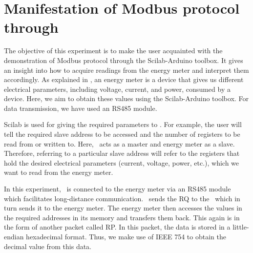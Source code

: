 
\section{Manifestation of Modbus protocol through \scilab}
The objective of this experiment is to make the user acquainted with
the demonstration of Modbus protocol through the Scilab-Arduino toolbox. 
It gives an insight into how to acquire readings from the energy meter and interpret them accordingly. As explained in , 
an energy meter is a device that gives us different electrical parameters, including voltage, current, and power, consumed by a device. Here, we aim to obtain these values using the Scilab-Arduino toolbox. For data transmission, we have used an RS485 module.

Scilab is used for giving the required parameters to \arduino. For
example, the user will tell the required slave address to be accessed
and the number of registers to be read from or written to. Here,
\arduino\ acts as a master and energy meter as a slave. Therefore,
referring to a particular slave address will refer to the registers
that hold the desired electrical parameters (current, voltage, power, etc.), which we want to read from the energy meter.

In this experiment, \arduino\ is connected to the energy meter via an RS485 module which facilitates long-distance communication. 
\scilab\ sends the RQ to the \arduino\, which in turn sends it to the
energy meter. The energy meter then accesses the values in the
required addresses in its memory and transfers them back. This again
is in the form of another packet called RP. In this packet, the data is stored in a little-endian hexadecimal format. Thus, we make use of IEEE 754 to obtain the decimal value from this data. 



